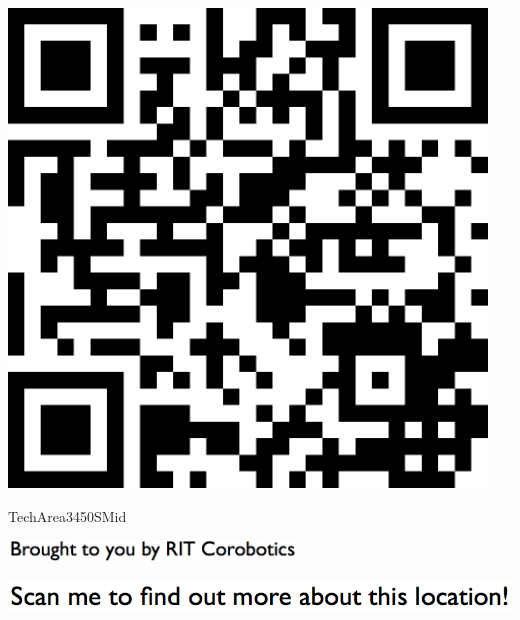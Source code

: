 \documentclass[letterpaper]{article}
\begin{document}
 \begingroup 
 \centerline{\includegraphics[scale=1,width=5in,height=5in]{TechArea3450SMid.png}} 
 \endgroup 
 \vspace*{\fill} 

 \hfill{\small TechArea3450SMid} 

  \vspace{0.7in} 
 
 \centerline{\includegraphics[scale=1,width=3in]{text-bottom.png}} 
 
 \pagebreak 
{} 
 \vspace*{\fill} 
 
  \centerline{\includegraphics[scale=1,width=6in]{text-top.png}} 
 
 \vspace{0.5in} 
 
\end{document}
